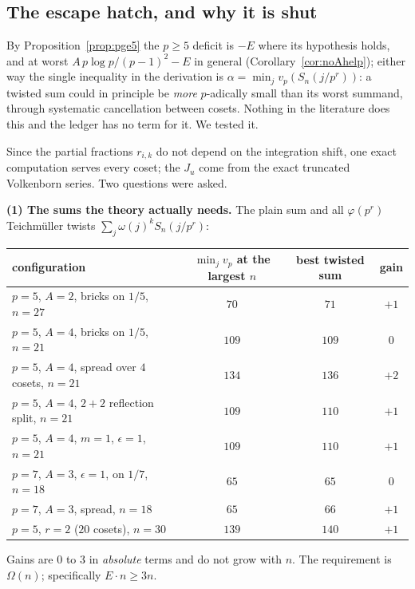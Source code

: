 \subsection{The escape hatch, and why it is shut}\label{ss:hatch}

By Proposition~\ref{prop:pge5} the $p\ge5$ deficit is $-E$ where its hypothesis holds, and
at worst $A\,p\log p/(p-1)^2-E$ in general (Corollary~\ref{cor:noAhelp}); either way the
single inequality in the derivation is $\alpha=\min_j v_p(S_n(j/p^r))$: a twisted sum could in principle be
\emph{more} $p$-adically small than its worst summand, through systematic cancellation
between cosets. Nothing in the literature does this and the ledger has no term for it. We
tested it.

Since the partial fractions $r_{i,k}$ do not depend on the integration shift, one exact
computation serves every coset; the $J_u$ come from the exact truncated Volkenborn series.
Two questions were asked.

\smallskip\noindent\textbf{(1) The sums the theory actually needs.} The plain sum and all
$\varphi(p^r)$ Teichm\"uller twists $\sum_j\omega(j)^kS_n(j/p^r)$:
\begin{center}
\tabsmall
\begin{tabular}{lccc}
\toprule
configuration & $\min_jv_p$ at the largest $n$ & best twisted sum & gain\\
\midrule
$p{=}5$, $A{=}2$, bricks on $1/5$, $n{=}27$ & $70$ & $71$ & $+1$\\
$p{=}5$, $A{=}4$, bricks on $1/5$, $n{=}21$ & $109$ & $109$ & $0$\\
$p{=}5$, $A{=}4$, spread over $4$ cosets, $n{=}21$ & $134$ & $136$ & $+2$\\
$p{=}5$, $A{=}4$, $2{+}2$ reflection split, $n{=}21$ & $109$ & $110$ & $+1$\\
$p{=}5$, $A{=}4$, $m{=}1$, $\epsilon{=}1$, $n{=}21$ & $109$ & $110$ & $+1$\\
$p{=}7$, $A{=}3$, $\epsilon{=}1$, on $1/7$, $n{=}18$ & $65$ & $65$ & $0$\\
$p{=}7$, $A{=}3$, spread, $n{=}18$ & $65$ & $66$ & $+1$\\
$p{=}5$, $r{=}2$ ($20$ cosets), $n{=}30$ & $139$ & $140$ & $+1$\\
\bottomrule
\end{tabular}
\end{center}
Gains are $0$ to $3$ in \emph{absolute} terms and do not grow with $n$. The requirement is
$\Omega(n)$; specifically $E\cdot n\ge3n$.


